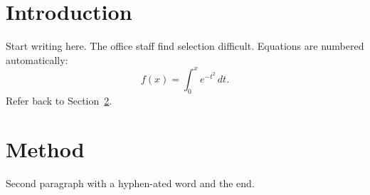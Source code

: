 \documentclass[11pt]{article}
\begin{document}
\section{Introduction}
Start writing here. The office staff find selection difficult.
Equations are numbered automatically:
\begin{equation}
  f(x) = \int_0^x e^{-t^2}\,dt .
\end{equation}
Refer back to Section~\ref{sec:method}.

\section{Method}\label{sec:method}
Second paragraph with a hyphen-ated word and the end.
\end{document}
